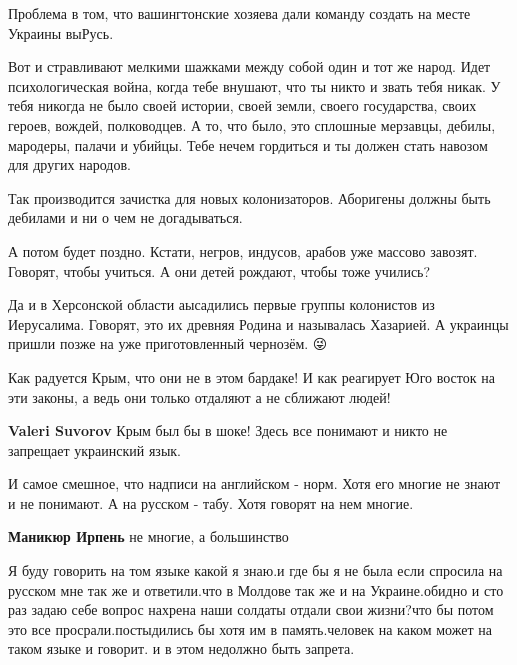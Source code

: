 \begin{itemize}
{Проблема в том, что вашингтонские хозяева дали команду создать на месте Украины выРусь.

Вот и стравливают мелкими шажками между собой один и тот же народ. Идет
психологическая война, когда тебе внушают, что ты никто и звать тебя никак. У
тебя никогда не было своей истории, своей земли, своего государства, своих
героев, вождей, полководцев. А то, что было, это сплошные мерзавцы, дебилы,
мародеры, палачи и убийцы. Тебе нечем гордиться и ты должен стать навозом для
других народов.

Так производится зачистка для новых колонизаторов. Аборигены должны быть
дебилами и ни о чем не догадываться.

А потом будет поздно. Кстати, негров, индусов, арабов уже массово завозят.
Говорят, чтобы учиться. А они детей рождают, чтобы тоже учились?

Да и в Херсонской области аысадились первые группы колонистов из Иерусалима.
Говорят, это их древняя Родина и называлась Хазарией. А украинцы пришли позже
на уже приготовленный чернозём. 😜


Как радуется Крым, что они не в этом бардаке! И как реагирует Юго восток на эти
законы, а ведь они только отдаляют а не сближают людей!


\textbf{Valeri Suvorov} Крым был бы в шоке! Здесь все понимают и никто не
запрещает украинский язык.


И самое смешное, что надписи на английском - норм. Хотя его многие не знают и
не понимают. А на русском - табу. Хотя говорят на нем многие.

\textbf{Маникюр Ирпень} не многие, а большинство


Я буду говорить на том языке какой я знаю.и где бы я не была если спросила на
русском мне так же и ответили.что в Молдове так же и на Украине.обидно и сто
раз задаю себе вопрос нахрена наши солдаты отдали свои жизни?что бы потом это
все просрали.постыдились бы хотя им в память.человек на каком может на таком
языке и говорит. и в этом недолжно быть запрета.

}
\end{itemize}
